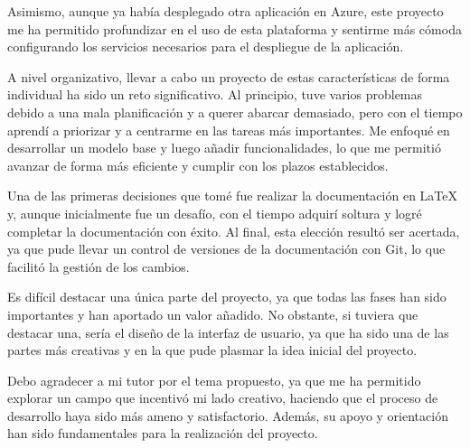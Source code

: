 Asimismo, aunque ya había desplegado otra aplicación en Azure, este proyecto me ha permitido profundizar en el uso de esta plataforma y sentirme más cómoda configurando 
los servicios necesarios para el despliegue de la aplicación.

A nivel organizativo, llevar a cabo un proyecto de estas características de forma individual ha sido un reto significativo.
Al principio, tuve varios problemas debido a una mala planificación y a querer abarcar demasiado, pero con el tiempo aprendí a priorizar y a centrarme en las tareas más importantes. 
Me enfoqué en desarrollar un modelo base y luego añadir funcionalidades, lo que me permitió avanzar de forma más eficiente y cumplir con los plazos establecidos.

Una de las primeras decisiones que tomé fue realizar la documentación en LaTeX y, aunque inicialmente fue un desafío, con el tiempo adquirí soltura y logré completar la documentación con éxito. 
Al final, esta elección resultó ser acertada, ya que pude llevar un control de versiones de la documentación con Git, lo que facilitó la gestión de los cambios.

Es difícil destacar una única parte del proyecto, ya que todas las fases han sido importantes y han aportado un valor añadido. No obstante, si tuviera que destacar una, 
sería el diseño de la interfaz de usuario, ya que ha sido una de las partes más creativas y en la que pude plasmar la idea inicial del proyecto.

Debo agradecer a mi tutor por el tema propuesto, ya que me ha permitido explorar un campo que incentivó mi lado creativo, haciendo que el proceso de desarrollo haya sido más ameno y satisfactorio. 
Además, su apoyo y orientación han sido fundamentales para la realización del proyecto.